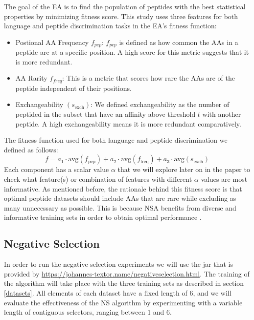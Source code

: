 \documentclass{article}
\begin{document}
The goal of the EA is to find the population of peptides with the best statistical properties by minimizing fitness score.
This study uses three features for both language and peptide discrimination tasks in the EA's fitness function:

\begin{itemize}
    \item Postional AA Frequency $f_{pep}$:
        $f_{pep}$ is defined as how common the AAs in a peptide are at a specific position. A high score for this metric suggests that it is more redundant.

    \item AA Rarity $f_{freq}$:
        This is a metric that scores how rare the AAs are of the peptide independent of their positions.
    
    \item Exchangeability $(s_{\text{exch}})$:
        We defined exchangeability as the number of peptided in the subset that have an affinity above threshold $t$ with another peptide.
        A high exchangeability means it is more redundant comparatively.

\end{itemize}

The fitness function used for both language and peptide discrimination we defined as follows:
\[f = a_1 \cdot \mathrm{avg}(f_{\text{pep}}) + a_2 \cdot \mathrm{avg}(f_{\text{freq}}) + a_3 \cdot \mathrm{avg}(s_{\text{exch}})\]
Each component has a scalar value $\alpha$ that we will explore later on in the paper to check what feature(s) or combination of features with different $\alpha$ values are most informative.
As mentioned before, the rationale behind this fitness score is that optimal peptide datasets should include AAs that are rare while excluding as many unnecessary as possible.
This is because NSA benefits from diverse and informative training sets in order to obtain optimal performance \cite{wortel2020t}.



\subsection{Negative Selection}
In order to run the negative selection experiments we will use the jar that is provided by \url{https://johannes-textor.name/negativeselection.html}.
The training of the algorithm will take place with the three training sets as described in section \ref{datasets}.
All elements of each dataset have a fixed length of 6, and we will evaluate the effectiveness of the NS algorithm by 
experimenting  with a variable length of contiguous selectors, ranging between 1 and 6. 
\end{document}

